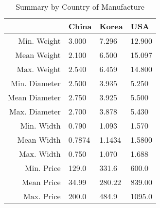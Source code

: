 \begin{table}[ht]
\centering
\begin{tabular}{rlll}
  \hline
 & China & Korea & USA \\ 
  \hline
Min. Weight &  3.000 &  7.296 & 12.900 \\ 
  Mean Weight &  2.100 &  6.500 & 15.097 \\ 
  Max. Weight &  2.540 &  6.459 & 14.800 \\ 
  Min. Diameter & 2.500 & 3.935 & 5.250 \\ 
  Mean Diameter & 2.750 & 3.925 & 5.500 \\ 
  Max. Diameter & 2.700 & 3.878 & 5.430 \\ 
  Min. Width & 0.790 & 1.093 & 1.570 \\ 
  Mean Width & 0.7874 & 1.1434 & 1.5800 \\ 
  Max. Width & 0.750 & 1.070 & 1.688 \\ 
  Min. Price & 129.0 & 331.6 & 600.0 \\ 
  Mean Price &  34.99 & 280.22 & 839.00 \\ 
  Max. Price &  200.0 &  484.9 & 1095.0 \\ 
   \hline
\end{tabular}
\caption{Summary by Country of Manufacture} 
\label{tab:summ_by_country}
\end{table}

